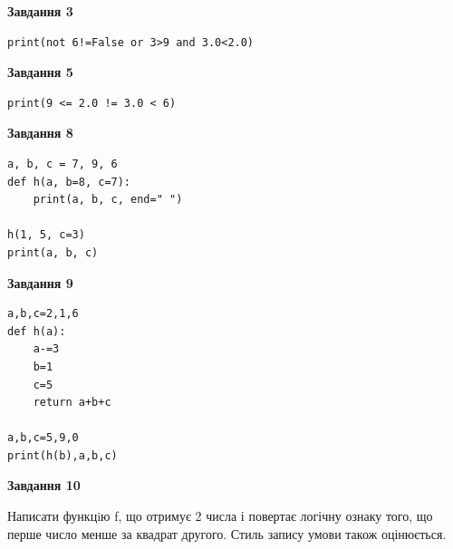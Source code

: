 \documentclass[12pt, ukrainian]{article}
\begin{document}
{\begin {large}
\begin{minipage}[t]{7.5cm}
\end{minipage}
\vline \hspace{6mm}
\begin{minipage}[t]{10.5cm}

\begin{center}
\textbf{Завдання 3}
\end{center}

\begin{verbatim}
print(not 6!=False or 3>9 and 3.0<2.0)
\end{verbatim}



\begin{center}
\textbf{Завдання 5}
\end{center}

\begin{verbatim}
print(9 <= 2.0 != 3.0 < 6)
\end{verbatim}



\begin{center}
\textbf{Завдання 8}
\end{center}

\begin{verbatim}
a, b, c = 7, 9, 6
def h(a, b=8, c=7):
    print(a, b, c, end=" ")

h(1, 5, c=3)
print(a, b, c)
\end{verbatim}



\begin{center}
\textbf{Завдання 9}
\end{center}

\begin{verbatim}
a,b,c=2,1,6
def h(a):
    a-=3
    b=1
    c=5
    return a+b+c

a,b,c=5,9,0
print(h(b),a,b,c)
\end{verbatim}



\begin{center}
\textbf{Завдання 10}
\end{center}

Написати функцiю f, що отримує 2 числа і повертає логічну ознаку того, що перше число менше за квадрат другого. Стиль запису умови також оцінюється.\par

\end{minipage}

\end {large}}
\newpage
\end{document}
